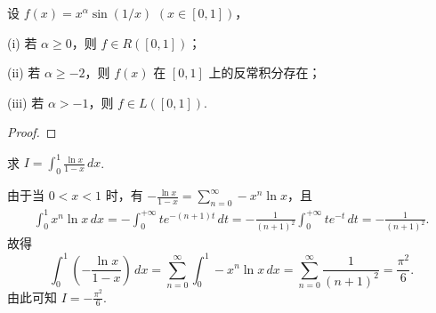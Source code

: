 \documentclass[../../main.tex]{subfiles}
\begin{document}
\begin{example}
设 \( f(x) = x^{\alpha} \sin(1/x) \) \( (x \in [0, 1]) \)，

(i) 若 \( \alpha \geq 0 \)，则 \( f \in R([0, 1]) \)；

(ii) 若 \( \alpha \geq -2 \)，则 \( f(x) \) 在 \( [0, 1] \) 上的反常积分存在；

(iii) 若 \( \alpha > -1 \)，则 \( f \in L([0, 1]) \).
\end{example}
\begin{proof}

\end{proof}

\begin{example}
求 \( I = \int_0^1 \frac{\ln x}{1 - x} \, dx \).
\end{example}
\begin{solution}
由于当 \( 0 < x < 1 \) 时，有 \( -\frac{\ln x}{1 - x} = \sum_{n = 0}^{\infty} -x^n \ln x \)，且
\begin{align*}
\int_0^1 x^n \ln x \, dx = -\int_0^{+\infty} t e^{-(n + 1)t} \, dt = -\frac{1}{(n + 1)^2} \int_0^{+\infty} t e^{-t} \, dt = -\frac{1}{(n + 1)^2}.
\end{align*}
故得
\[
\int_0^1 \left( -\frac{\ln x}{1 - x} \right) \, dx = \sum_{n = 0}^{\infty} \int_0^1 -x^n \ln x \, dx = \sum_{n = 0}^{\infty} \frac{1}{(n + 1)^2} = \frac{\pi^2}{6}.
\]
由此可知 \( I = -\frac{\pi^2}{6} \).
\end{solution}
\end{document}
